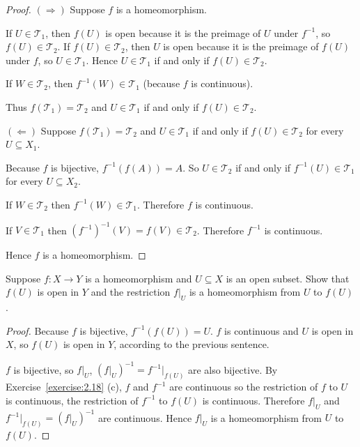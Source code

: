 \begin{proof}
	$(\Rightarrow)$ Suppose $f$ is a homeomorphism.

	If $U\in\mathscr{T}_{1}$, then $f(U)$ is open because it is the preimage of $U$ under $f^{-1}$, so $f(U)\in\mathscr{T}_{2}$. If $f(U)\in\mathscr{T}_{2}$, then $U$ is open because it is the preimage of $f(U)$ under $f$, so $U\in\mathscr{T}_{1}$. Hence $U\in\mathscr{T}_{1}$ if and only if $f(U)\in\mathscr{T}_{2}$.

	If $W\in\mathscr{T}_{2}$, then $f^{-1}(W)\in\mathscr{T}_{1}$ (because $f$ is continuous).

	Thus $f(\mathscr{T}_{1}) = \mathscr{T}_{2}$ and $U\in\mathscr{T}_{1}$ if and only if $f(U)\in \mathscr{T}_{2}$.

	$(\Leftarrow)$ Suppose $f(\mathscr{T}_{1}) = \mathscr{T}_{2}$ and $U\in\mathscr{T}_{1}$ if and only if $f(U)\in \mathscr{T}_{2}$ for every $U\subseteq X_{1}$.

	Because $f$ is bijective, $f^{-1}(f(A)) = A$. So $U\in\mathscr{T}_{2}$ if and only if $f^{-1}(U)\in\mathscr{T}_{1}$ for every $U\subseteq X_{2}$.

	If $W\in\mathscr{T}_{2}$ then $f^{-1}(W)\in\mathscr{T}_{1}$. Therefore $f$ is continuous.

	If $V\in\mathscr{T}_{1}$ then ${(f^{-1})}^{-1}(V) = f(V)\in \mathscr{T}_{2}$. Therefore $f^{-1}$ is continuous.

	Hence $f$ is a homeomorphism.
\end{proof}

\begin{exercise}{2.22}\label{exercise2.22}
	Suppose $f: X\to Y$ is a homeomorphism and $U\subseteq X$ is an open subset. Show that $f(U)$ is open in $Y$ and the restriction $f\vert_{U}$ is a homeomorphism from $U$ to $f(U)$.
\end{exercise}

\begin{proof}
	Because $f$ is bijective, $f^{-1}(f(U)) = U$. $f$ is continuous and $U$ is open in $X$, so $f(U)$ is open in $Y$, according to the previous sentence.

	$f$ is bijective, so $f\vert_{U}$, ${(f\vert_{U})}^{-1} = f^{-1}\vert_{f(U)}$ are also bijective. By Exercise~\ref{exercise:2.18} (c), $f$ and $f^{-1}$ are continuous so the restriction of $f$ to $U$ is continuous, the restriction of $f^{-1}$ to $f(U)$ is continuous. Therefore $f\vert_{U}$ and $f^{-1}\vert_{f(U)} = {(f\vert_{U})}^{-1}$ are continuous. Hence $f\vert_{U}$ is a homeomorphism from $U$ to $f(U)$.
\end{proof}

